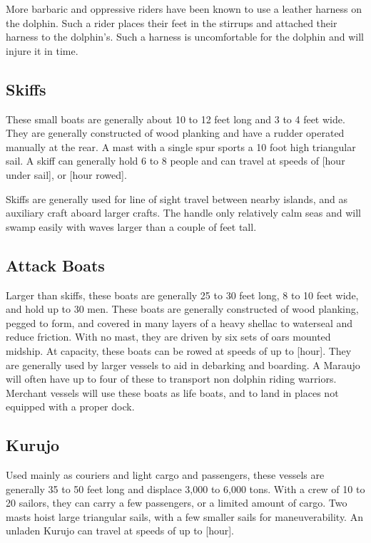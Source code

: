 More barbaric and oppressive riders have been known to use a leather harness on the dolphin. Such a rider places their feet in the stirrups and attached their harness to the dolphin's. Such a harness is uncomfortable for the dolphin and will injure it in time.
\subsection{Skiffs}

These small boats are generally about 10 to 12 feet long and 3 to 4 feet wide. They are generally constructed of wood planking and have a rudder operated manually at the rear. A mast with a single spur sports a 10 foot high triangular sail. A skiff can generally hold 6 to 8 people and can travel at speeds of [hour under sail], or [hour rowed].

Skiffs are generally used for line of sight travel between nearby islands, and as auxiliary craft aboard larger crafts. The handle only relatively calm seas and will swamp
easily with waves larger than a couple of feet tall.
\subsection{Attack Boats}

Larger than skiffs, these boats are generally 25 to 30 feet long, 8 to 10 feet wide, and hold up to 30 men. These boats are generally constructed of wood planking, pegged to form, and covered in many layers of a heavy shellac to waterseal and reduce friction. With no mast, they are driven by six sets of oars mounted midship. At capacity, these boats can be rowed at speeds of up to [hour]. They are generally used by larger vessels to aid in debarking and boarding. A Maraujo will often have up to four of these to transport non dolphin riding warriors. Merchant vessels will use these boats as life boats, and to land in places not equipped with a proper dock.
\subsection{Kurujo}

Used mainly as couriers and light cargo and passengers, these vessels are generally 35 to 50 feet long and displace 3,000 to 6,000 tons. With a crew of 10 to 20 sailors, they can carry a few passengers, or a limited amount of cargo. Two masts hoist large triangular sails, with a few smaller sails for maneuverability. An unladen Kurujo can travel at speeds of up to [hour].
